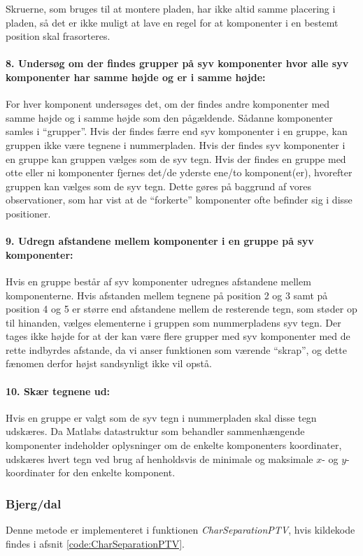 Skruerne, som bruges til at montere pladen, har ikke altid samme placering i pladen, så det er ikke muligt at lave en regel for at komponenter i en bestemt position skal frasorteres.

\paragraph{8. Undersøg om der findes grupper på syv komponenter hvor alle syv komponenter har samme højde og er i samme højde:} For hver komponent undersøges det, om der findes andre komponenter med samme højde og i samme højde som den pågældende. Sådanne komponenter samles i ``grupper''. Hvis der findes færre end syv komponenter i en gruppe, kan gruppen ikke være tegnene i nummerpladen. Hvis der findes syv komponenter i en gruppe kan gruppen vælges som de syv tegn. Hvis der findes en gruppe med otte eller ni komponenter fjernes det/de yderste ene/to komponent(er), hvorefter gruppen kan vælges som de syv tegn. Dette gøres på baggrund af vores observationer, som har vist at de ``forkerte'' komponenter ofte befinder sig i disse positioner.

\paragraph{9. Udregn afstandene mellem komponenter i en gruppe på syv komponenter:} Hvis en gruppe består af syv komponenter udregnes afstandene mellem komponenterne. Hvis afstanden mellem tegnene på position 2 og 3 samt på position 4 og 5 er større end afstandene mellem de resterende tegn, som støder op til hinanden, vælges elementerne i gruppen som nummerpladens syv tegn. Der tages ikke højde for at der kan være flere grupper med syv komponenter med de rette indbyrdes afstande, da vi anser funktionen som værende ``skrap'', og dette fænomen derfor højst sandsynligt ikke vil opstå.

\paragraph{10. Skær tegnene ud:} Hvis en gruppe er valgt som de syv tegn i nummerpladen skal disse tegn udskæres. Da Matlabs datastruktur som behandler sammenhængende komponenter indeholder oplysninger om de enkelte komponenters koordinater, udskæres hvert tegn ved brug af henholdsvis de minimale og maksimale $x$- og $y$-koordinater for den enkelte komponent.

\subsubsection*{Bjerg/dal}
Denne metode er implementeret i funktionen \textit{CharSeparationPTV}, hvis kildekode findes i afsnit \vref{code:CharSeparationPTV}.

